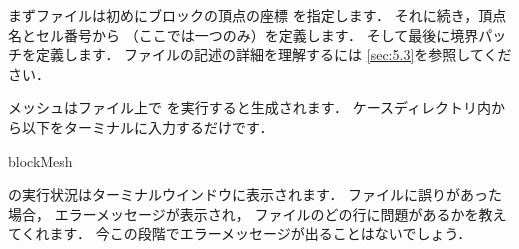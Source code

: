 まずファイルは初めにブロックの頂点の座標
%
%
を指定します．
それに続き，頂点名とセル番号から
%
%
（ここでは一つのみ）を定義します．
そして最後に境界パッチを定義します．
ファイルの記述の詳細を理解するには
\autoref{sec:5.3}を参照してください．

メッシュはファイル上で
を実行すると生成されます．
ケースディレクトリ内から以下をターミナルに入力するだけです．
\begin{OFverbatim}[terminal]
blockMesh
\end{OFverbatim}
の実行状況はターミナルウインドウに表示されます．
%
%
ファイルに誤りがあった場合，
エラーメッセージが表示され，
ファイルのどの行に問題があるかを教えてくれます．
今この段階でエラーメッセージが出ることはないでしょう．


